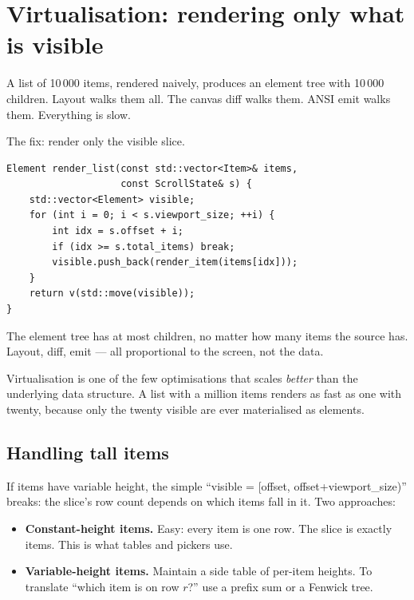 \section{Virtualisation: rendering only what is visible}

A list of 10\,000 items, rendered naively, produces an element
tree with 10\,000 children. Layout walks them all. The canvas
diff walks them. ANSI emit walks them. Everything is slow.

The fix: render only the visible slice.

\begin{lstlisting}
Element render_list(const std::vector<Item>& items,
                    const ScrollState& s) {
    std::vector<Element> visible;
    for (int i = 0; i < s.viewport_size; ++i) {
        int idx = s.offset + i;
        if (idx >= s.total_items) break;
        visible.push_back(render_item(items[idx]));
    }
    return v(std::move(visible));
}
\end{lstlisting}

The element tree has at most  children, no
matter how many items the source has. Layout, diff, emit ---
all proportional to the screen, not the data.

\begin{idea}
Virtualisation is one of the few optimisations that scales
\emph{better} than the underlying data structure. A list with a
million items renders as fast as one with twenty, because only
the twenty visible are ever materialised as elements.
\end{idea}

\subsection*{Handling tall items}

If items have variable height, the simple ``visible =
[offset, offset+viewport\_size)'' breaks: the slice's row count
depends on which items fall in it. Two approaches:

\begin{itemize}[leftmargin=*]
  \item \textbf{Constant-height items.} Easy: every item is one
    row. The slice is exactly  items. This
    is what tables and pickers use.
  \item \textbf{Variable-height items.} Maintain a side table of
    per-item heights. To translate ``which item is on row $r$?''
    use a prefix sum or a Fenwick tree.
\end{itemize}

